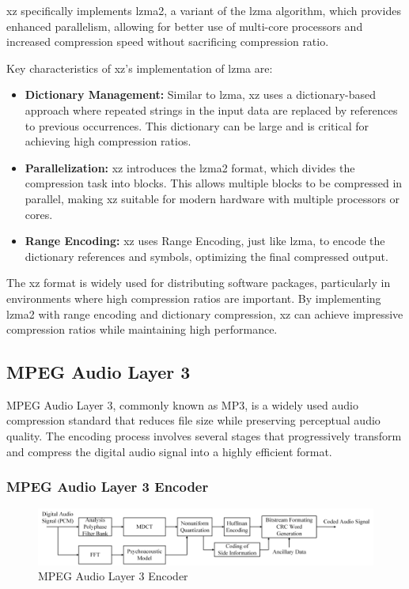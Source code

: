     xz specifically implements \gls{lzma}2, a variant of the \gls{lzma} algorithm, which provides enhanced parallelism, allowing for better use of multi-core processors and increased compression speed without sacrificing compression ratio.

    Key characteristics of xz's implementation of \gls{lzma} are:

    \begin{itemize}
        \item \textbf{Dictionary Management:} Similar to \gls{lzma}, xz uses a dictionary-based approach where repeated strings in the input data are replaced by references to previous occurrences. This dictionary can be large and is critical for achieving high compression ratios.
        \item \textbf{Parallelization:} xz introduces the \gls{lzma}2 format, which divides the compression task into blocks. This allows multiple blocks to be compressed in parallel, making xz suitable for modern hardware with multiple processors or cores.
        \item \textbf{Range Encoding:} xz uses Range Encoding, just like \gls{lzma}, to encode the dictionary references and symbols, optimizing the final compressed output.
    \end{itemize}

    The xz format is widely used for distributing software packages, particularly in environments where high compression ratios are important. By implementing \gls{lzma}2 with range encoding and dictionary compression, xz can achieve impressive compression ratios while maintaining high performance.

    \subsection{MPEG Audio Layer 3}
    MPEG Audio Layer 3, commonly known as MP3, is a widely used audio compression standard that reduces file size while preserving perceptual audio quality. The encoding process involves several stages that progressively transform and compress the digital audio signal into a highly efficient format.
    
    \subsubsection{MPEG Audio Layer 3 Encoder}
        \begin{figure}[H]
            \centering
            \includegraphics[width=0.95\linewidth]{assets/mp3_encoder.png}
            \caption{MPEG Audio Layer 3 Encoder}
            \label{fig:mp3_encoder}
        \end{figure}

